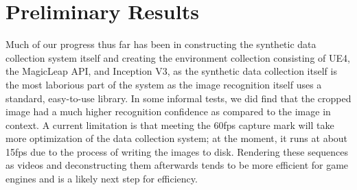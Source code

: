 \section{Preliminary Results}

Much of our progress thus far has been in constructing the synthetic data
collection system itself and creating the environment collection consisting of
UE4, the MagicLeap API, and Inception V3, as the synthetic data collection
itself is the most laborious part of the system as the image recognition itself
uses a standard, easy-to-use library. In some informal tests, we did find that
the cropped image had a much higher recognition confidence as compared to the
image in context. A current limitation is that meeting the 60fps capture mark
will take more optimization of the data collection system; at the moment, it
runs at about 15fps due to the process of writing the images to disk. Rendering
these sequences as videos and deconstructing them afterwards tends to be more
efficient for game engines and is a likely next step for efficiency.
